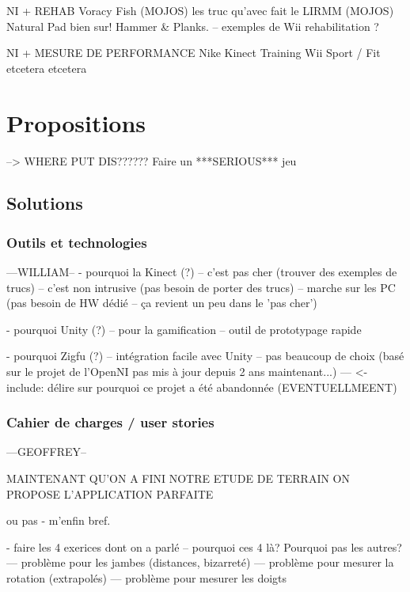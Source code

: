 \documentclass{report}
\begin{document}
		NI + REHAB
		Voracy Fish (MOJOS)
		les truc qu'avec fait le LIRMM (MOJOS)
 		Natural Pad bien sur! Hammer \& Planks.
		-- exemples de Wii rehabilitation ?
		
		NI + MESURE DE PERFORMANCE
		Nike Kinect Training
		Wii Sport / Fit
		etcetera etcetera
		
		
	\chapter{Propositions}
	
	
	
		--> WHERE PUT DIS?????? Faire un ***SERIOUS*** jeu
		
		
		
		\section{Solutions}
		
		\subsection{Outils et technologies} 		---WILLIAM--
		- pourquoi la Kinect (?)
		-- c'est pas cher (trouver des exemples de trucs)
		-- c'est non intrusive (pas besoin de porter des trucs)
		-- marche sur les PC (pas besoin de HW dédié -- ça revient un peu dans le 'pas cher')
		
		- pourquoi Unity (?)
		-- pour la gamification
		-- outil de prototypage rapide
		
		- pourquoi Zigfu (?)
		-- intégration facile avec Unity
		-- pas beaucoup de choix (basé sur le projet de l'OpenNI pas mis à jour depuis 2 ans maintenant...)
		--- <- include: délire sur pourquoi ce projet a été abandonnée (EVENTUELLMEENT)
		
		
		\subsection{Cahier de charges / user stories} 		---GEOFFREY--
		
		MAINTENANT QU'ON A FINI NOTRE ETUDE DE TERRAIN ON PROPOSE L'APPLICATION PARFAITE 
		
		ou pas - m'enfin bref.
		
		- faire les 4 exerices dont on a parlé
		-- pourquoi ces 4 là? Pourquoi pas les autres?
		--- problème pour les jambes (distances, bizarreté)
		--- problème pour mesurer la rotation (extrapolés)
		--- problème pour mesurer les doigts 
		
\end{document}
